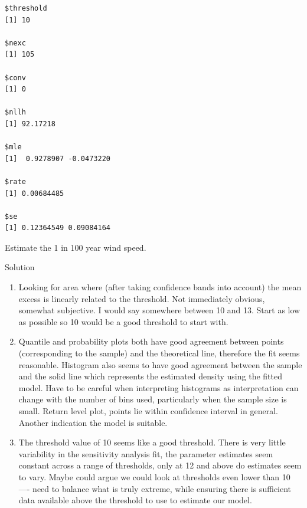 \documentclass[
  letterpaper,
  DIV=11,
  numbers=noendperiod,
  oneside]{scrartcl}
\begin{document}
\begin{tcolorbox}
\begin{verbatim}
$threshold
[1] 10

$nexc
[1] 105

$conv
[1] 0

$nllh
[1] 92.17218

$mle
[1]  0.9278907 -0.0473220

$rate
[1] 0.00684485

$se
[1] 0.12364549 0.09084164
\end{verbatim}

Estimate the 1 in 100 year wind speed.

Solution

\begin{enumerate}
\def\labelenumi{(\alph{enumi})}
\item
  Looking for area where (after taking confidence bands into account)
  the mean excess is linearly related to the threshold. Not immediately
  obvious, somewhat subjective. I would say somewhere between 10 and 13.
  Start as low as possible so 10 would be a good threshold to start
  with.
\item
  Quantile and probability plots both have good agreement between points
  (corresponding to the sample) and the theoretical line, therefore the
  fit seems reasonable. Histogram also seems to have good agreement
  between the sample and the solid line which represents the estimated
  density using the fitted model. Have to be careful when interpreting
  histograms as interpretation can change with the number of bins used,
  particularly when the sample size is small. Return level plot, points
  lie within confidence interval in general. Another indication the
  model is suitable.
\item
  The threshold value of 10 seems like a good threshold. There is very
  little variability in the sensitivity analysis fit, the parameter
  estimates seem constant across a range of thresholds, only at 12 and
  above do estimates seem to vary. Maybe could argue we could look at
  thresholds even lower than 10 ---- need to balance what is truly
  extreme, while ensuring there is sufficient data available above the
  threshold to use to estimate our model.
\end{enumerate}

\end{tcolorbox}
\end{document}
